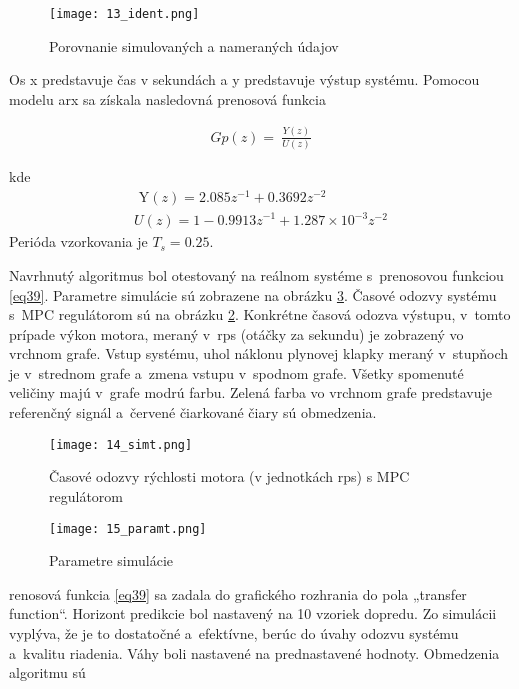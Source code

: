 \begin{figure}[h]
\centering
\texttt{[image: 13\_ident.png]}
\caption{Porovnanie simulovaných a nameraných údajov}
\label{13_ident}
\end{figure}
Os x predstavuje čas v sekundách a y predstavuje výstup systému. Pomocou modelu arx sa získala nasledovná prenosová funkcia

\begin{equation} \label{eq38}
\begin{split}
Gp(z) = \ \frac{Y(z)}{U(z)}
\end{split}
\end{equation}

kde
\begin{equation} \label{eq39}
\begin{split}
\text{\ Y}\left( z \right) = 2.085z^{- 1} + 0.3692z^{- 2} \\
U\left( z \right) = 1 - 0.99{13z}^{- 1} + 1.287 \times 10^{- 3}z^{- 2}
\end{split}
\end{equation}
Perióda vzorkovania je \(T_{s} = 0.25\).

Navrhnutý algoritmus bol otestovaný na reálnom systéme s~prenosovou
funkciou \ref{eq39}. Parametre simulácie sú zobrazene na obrázku \ref{15_paramt}. Časové odozvy systému s~MPC regulátorom sú
na obrázku \ref{14_simt}. Konkrétne časová odozva výstupu, v~tomto prípade
výkon motora, meraný v~rps (otáčky za sekundu) je zobrazený vo vrchnom
grafe. Vstup systému, uhol náklonu plynovej klapky meraný v~stupňoch je
v~strednom grafe a~zmena vstupu v~spodnom grafe. Všetky spomenuté
veličiny majú v~grafe modrú farbu. Zelená farba vo vrchnom grafe
predstavuje referenčný signál a~červené čiarkované čiary sú obmedzenia.

\begin{figure}[h]
\centering
\texttt{[image: 14\_simt.png]}
\caption{Časové odozvy rýchlosti motora (v jednotkách rps) s MPC regulátorom}
\label{14_simt}
\end{figure}

\begin{figure}[h]
\centering
\texttt{[image: 15\_paramt.png]}
\caption{Parametre simulácie}
\label{15_paramt}
\end{figure}

renosová funkcia \ref{eq39} sa zadala do grafického rozhrania do pola
„transfer function``. Horizont predikcie bol nastavený na 10 vzoriek
dopredu. Zo simulácii vyplýva, že je to dostatočné a~efektívne, berúc do
úvahy odozvu systému a~kvalitu riadenia. Váhy boli nastavené na
prednastavené hodnoty. Obmedzenia algoritmu sú

